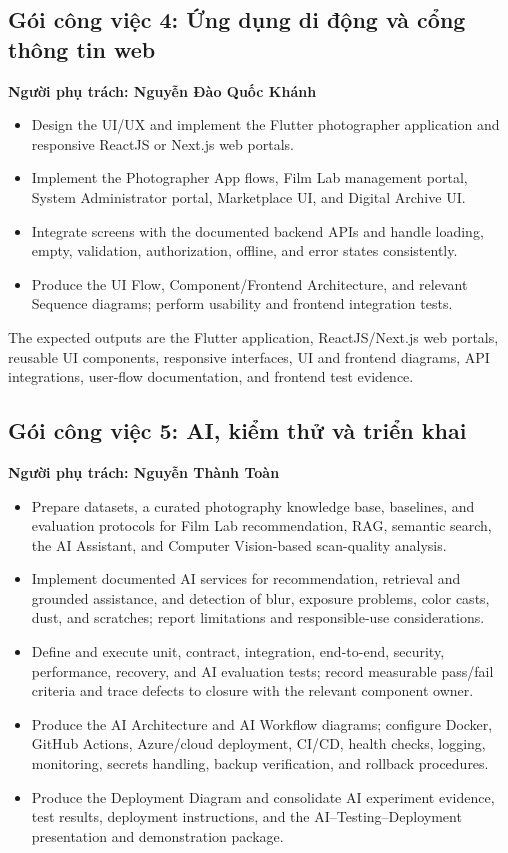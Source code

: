 \subsection*{Gói công việc 4: Ứng dụng di động và cổng thông tin web}

\textbf{Người phụ trách: Nguyễn Đào Quốc Khánh}

\begin{itemize}
	\item Design the UI/UX and implement the Flutter photographer application and
	responsive ReactJS or Next.js web portals.
	\item Implement the Photographer App flows, Film Lab management portal,
	System Administrator portal, Marketplace UI, and Digital Archive UI.
	\item Integrate screens with the documented backend APIs and handle loading,
	empty, validation, authorization, offline, and error states consistently.
	\item Produce the UI Flow, Component/Frontend Architecture, and relevant
	Sequence diagrams; perform usability and frontend integration tests.
\end{itemize}

The expected outputs are the Flutter application, ReactJS/Next.js web portals,
reusable UI components, responsive interfaces, UI and frontend diagrams, API
integrations, user-flow documentation, and frontend test evidence.

\subsection*{Gói công việc 5: AI, kiểm thử và triển khai}

\textbf{Người phụ trách: Nguyễn Thành Toàn}

\begin{itemize}
	\item Prepare datasets, a curated photography knowledge base, baselines, and
	evaluation protocols for Film Lab recommendation, RAG, semantic search, the
	AI Assistant, and Computer Vision-based scan-quality analysis.
	\item Implement documented AI services for recommendation, retrieval and
	grounded assistance, and detection of blur, exposure problems, color casts,
	dust, and scratches; report limitations and responsible-use considerations.
	\item Define and execute unit, contract, integration, end-to-end, security,
	performance, recovery, and AI evaluation tests; record measurable pass/fail
	criteria and trace defects to closure with the relevant component owner.
	\item Produce the AI Architecture and AI Workflow diagrams; configure Docker,
	GitHub Actions, Azure/cloud deployment, CI/CD, health checks, logging,
	monitoring, secrets handling, backup verification, and rollback procedures.
	\item Produce the Deployment Diagram and consolidate AI experiment evidence,
	test results, deployment instructions, and the AI--Testing--Deployment
	presentation and demonstration package.
\end{itemize}

